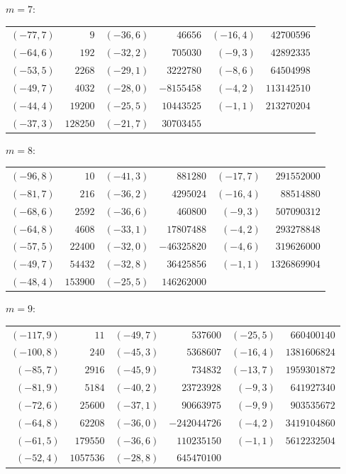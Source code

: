 \documentclass[11pt]{amsart}
\theoremstyle{definition}
\begin{document}
\noindent$m=7$:\nopagebreak\\[2pt]
{\small\begin{tabular}{@{}r@{\ \ }r@{\qquad}r@{\ \ }r@{\qquad}r@{\ \ }r@{}}
$(-77,7)$ & $9$ & $(-36,6)$ & $46656$ & $(-16,4)$ & $42700596$ \\
$(-64,6)$ & $192$ & $(-32,2)$ & $705030$ & $(-9,3)$ & $42892335$ \\
$(-53,5)$ & $2268$ & $(-29,1)$ & $3222780$ & $(-8,6)$ & $64504998$ \\
$(-49,7)$ & $4032$ & $(-28,0)$ & $-8155458$ & $(-4,2)$ & $113142510$ \\
$(-44,4)$ & $19200$ & $(-25,5)$ & $10443525$ & $(-1,1)$ & $213270204$ \\
$(-37,3)$ & $128250$ & $(-21,7)$ & $30703455$ & & \\
\end{tabular}}\par\medskip
\noindent$m=8$:\nopagebreak\\[2pt]
{\small\begin{tabular}{@{}r@{\ \ }r@{\qquad}r@{\ \ }r@{\qquad}r@{\ \ }r@{}}
$(-96,8)$ & $10$ & $(-41,3)$ & $881280$ & $(-17,7)$ & $291552000$ \\
$(-81,7)$ & $216$ & $(-36,2)$ & $4295024$ & $(-16,4)$ & $88514880$ \\
$(-68,6)$ & $2592$ & $(-36,6)$ & $460800$ & $(-9,3)$ & $507090312$ \\
$(-64,8)$ & $4608$ & $(-33,1)$ & $17807488$ & $(-4,2)$ & $293278848$ \\
$(-57,5)$ & $22400$ & $(-32,0)$ & $-46325820$ & $(-4,6)$ & $319626000$ \\
$(-49,7)$ & $54432$ & $(-32,8)$ & $36425856$ & $(-1,1)$ & $1326869904$ \\
$(-48,4)$ & $153900$ & $(-25,5)$ & $146262000$ & & \\
\end{tabular}}\par\medskip
\noindent$m=9$:\nopagebreak\\[2pt]
{\small\begin{tabular}{@{}r@{\ \ }r@{\qquad}r@{\ \ }r@{\qquad}r@{\ \ }r@{}}
$(-117,9)$ & $11$ & $(-49,7)$ & $537600$ & $(-25,5)$ & $660400140$ \\
$(-100,8)$ & $240$ & $(-45,3)$ & $5368607$ & $(-16,4)$ & $1381606824$ \\
$(-85,7)$ & $2916$ & $(-45,9)$ & $734832$ & $(-13,7)$ & $1959301872$ \\
$(-81,9)$ & $5184$ & $(-40,2)$ & $23723928$ & $(-9,3)$ & $641927340$ \\
$(-72,6)$ & $25600$ & $(-37,1)$ & $90663975$ & $(-9,9)$ & $903535672$ \\
$(-64,8)$ & $62208$ & $(-36,0)$ & $-242044726$ & $(-4,2)$ & $3419104860$ \\
$(-61,5)$ & $179550$ & $(-36,6)$ & $110235150$ & $(-1,1)$ & $5612232504$ \\
$(-52,4)$ & $1057536$ & $(-28,8)$ & $645470100$ & & \\
\end{tabular}}\par\medskip
\end{document}
